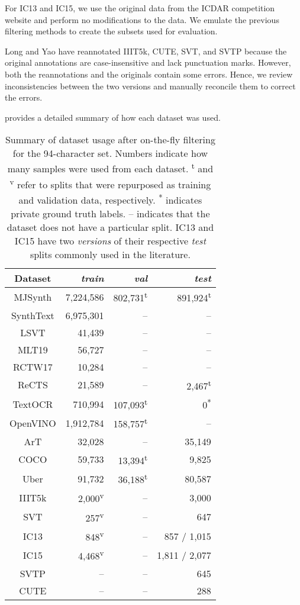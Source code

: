 For IC13 and IC15, we use the original data from the ICDAR competition website and perform no modifications to the data. We emulate the previous filtering methods \cite{wang2011end,cheng2017focusing} to create the subsets used for evaluation.

Long and Yao \cite{long2020unreal} have reannotated IIIT5k, CUTE, SVT, and SVTP because the original annotations are case-insensitive and lack punctuation marks. However, both the reannotations and the originals contain some errors. Hence, we review inconsistencies between the two versions and manually reconcile them to correct the errors.

 provides a detailed summary of how each dataset was used.

\begin{table}[htbp]
  \centering
  \fontsize{6.5}{7.8}\selectfont
  \caption{Summary of dataset usage after on-the-fly filtering for the 94-character set. Numbers indicate how many samples were used from each dataset. \textsuperscript{t} and \textsuperscript{v} refer to splits that were repurposed as training and validation data, respectively. \textsuperscript{*} indicates private ground truth labels. -- indicates that the dataset does not have a particular split. IC13 and IC15 have two \textit{versions} of their respective \textit{test} splits commonly used in the literature.}
  \setlength{\tabcolsep}{10pt}
  \begin{tabular}{ c | r r r }
    \toprule
    Dataset & \textit{train} & \textit{val} & \textit{test} \\
    \midrule
    MJSynth & 7,224,586 & 802,731\textsuperscript{t} & 891,924\textsuperscript{t} \\
    SynthText & 6,975,301 & -- & -- \\
    \midrule
    LSVT & 41,439 & -- & -- \\
    MLT19 & 56,727 & -- & -- \\
    RCTW17 & 10,284 & -- & -- \\
    ReCTS & 21,589 & -- & 2,467\textsuperscript{t} \\
    TextOCR & 710,994 & 107,093\textsuperscript{t} & 0\textsuperscript{*} \\
    OpenVINO & 1,912,784 & 158,757\textsuperscript{t} & -- \\
    \midrule
    ArT & 32,028 & -- & 35,149 \\
    COCO & 59,733 & 13,394\textsuperscript{t} & 9,825 \\
    Uber & 91,732 & 36,188\textsuperscript{t} & 80,587 \\
    \midrule
    IIIT5k & 2,000\textsuperscript{v} & -- & 3,000 \\
    SVT & 257\textsuperscript{v} & -- & 647 \\
    IC13 & 848\textsuperscript{v} & -- & 857 / 1,015 \\
    IC15 & 4,468\textsuperscript{v} & -- & 1,811 / 2,077 \\
    SVTP & -- & -- & 645 \\
    CUTE & -- & -- & 288 \\
    \bottomrule
  \end{tabular}
  \label{tab:dataset}
\end{table}


